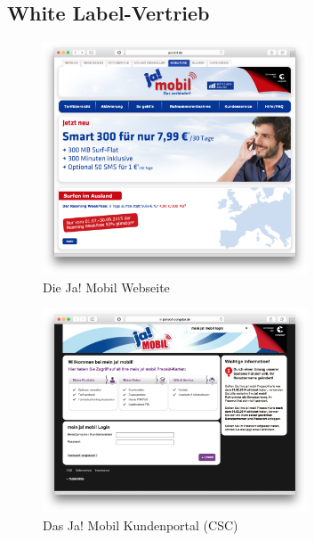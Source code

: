 \documentclass[11pt,a4paper]{article}
\begin{document}
\subsection{White Label-Vertrieb}


\begin{figure}[H]
\includegraphics[width=0.7\textwidth]{images/Sites/White_Label/Ja_Mobil.png}
\centering
\caption{Die Ja! Mobil Webseite \cite{ja}}
\end{figure}

\begin{figure}[H]
\includegraphics[width=0.7\textwidth]{images/Sites/White_Label/Ja_Mobil_CSC.png}
\centering
\caption{Das Ja! Mobil Kundenportal (CSC) \cite{jacsc}}
\end{figure}
\end{document}
